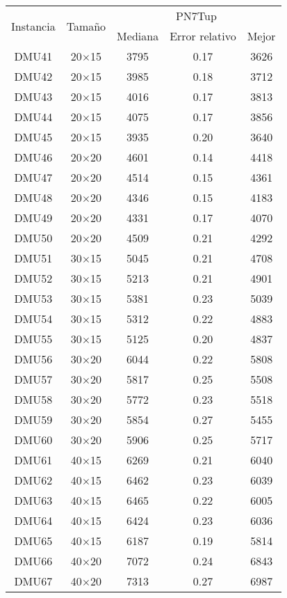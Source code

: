 \begin{table}[H]
\centering
\begin{tabular}{@{}ccccc@{}}
\toprule
\multirow{2}{*}{Instancia} & \multirow{2}{*}{Tamaño} & \multicolumn{3}{c}{ PN7Tup} \\ \cmidrule(lr){3-5}
& & Mediana& Error relativo & Mejor  \\ \midrule
DMU41 & 20$\times$15 & 3795 & 0.17 & 3626\\ 
DMU42 & 20$\times$15 & 3985 & 0.18 & 3712\\ 
DMU43 & 20$\times$15 & 4016 & 0.17 & 3813\\ 
DMU44 & 20$\times$15 & 4075 & 0.17 & 3856\\ 
DMU45 & 20$\times$15 & 3935 & 0.20 & 3640\\ 
DMU46 & 20$\times$20 & 4601 & 0.14 & 4418\\ 
DMU47 & 20$\times$20 & 4514 & 0.15 & 4361\\ 
DMU48 & 20$\times$20 & 4346 & 0.15 & 4183\\ 
DMU49 & 20$\times$20 & 4331 & 0.17 & 4070\\ 
DMU50 & 20$\times$20 & 4509 & 0.21 & 4292\\ 
DMU51 & 30$\times$15 & 5045 & 0.21 & 4708\\ 
DMU52 & 30$\times$15 & 5213 & 0.21 & 4901\\ 
DMU53 & 30$\times$15 & 5381 & 0.23 & 5039\\ 
DMU54 & 30$\times$15 & 5312 & 0.22 & 4883\\ 
DMU55 & 30$\times$15 & 5125 & 0.20 & 4837\\ 
DMU56 & 30$\times$20 & 6044 & 0.22 & 5808\\ 
DMU57 & 30$\times$20 & 5817 & 0.25 & 5508\\ 
DMU58 & 30$\times$20 & 5772 & 0.23 & 5518\\ 
DMU59 & 30$\times$20 & 5854 & 0.27 & 5455\\ 
DMU60 & 30$\times$20 & 5906 & 0.25 & 5717\\ 
DMU61 & 40$\times$15 & 6269 & 0.21 & 6040\\ 
DMU62 & 40$\times$15 & 6462 & 0.23 & 6039\\ 
DMU63 & 40$\times$15 & 6465 & 0.22 & 6005\\ 
DMU64 & 40$\times$15 & 6424 & 0.23 & 6036\\ 
DMU65 & 40$\times$15 & 6187 & 0.19 & 5814\\ 
DMU66 & 40$\times$20 & 7072 & 0.24 & 6843\\ 
DMU67 & 40$\times$20 & 7313 & 0.27 & 6987\\ 

\end{tabular}
\end{table}
